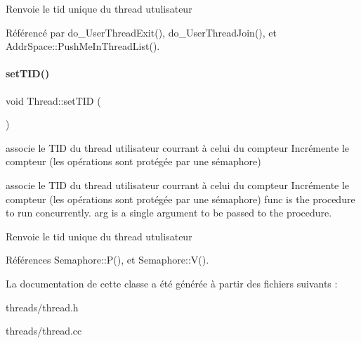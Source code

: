 \begin{DoxyReturn}{Renvoie}
le tid unique du thread utulisateur 
\end{DoxyReturn}


Référencé par do\+\_\+\+User\+Thread\+Exit(), do\+\_\+\+User\+Thread\+Join(), et Addr\+Space\+::\+Push\+Me\+In\+Thread\+List().

\hypertarget{class_thread_a6208073ef0f52efa40eb5e813a191954}{}\label{class_thread_a6208073ef0f52efa40eb5e813a191954} 
\paragraph{\texorpdfstring{set\+T\+I\+D()}{setTID()}}
{\footnotesize\ttfamily void Thread\+::set\+T\+ID (\begin{DoxyParamCaption}{ }\end{DoxyParamCaption})}



associe le T\+ID du thread utilisateur courrant à celui du compteur Incrémente le compteur (les opérations sont protégée par une sémaphore) 

associe le T\+ID du thread utilisateur courrant à celui du compteur Incrémente le compteur (les opérations sont protégée par une sémaphore)  func is the procedure to run concurrently.  arg is a single argument to be passed to the procedure.

\begin{DoxyReturn}{Renvoie}
le tid unique du thread utulisateur 
\end{DoxyReturn}


Références Semaphore\+::\+P(), et Semaphore\+::\+V().



La documentation de cette classe a été générée à partir des fichiers suivants \+:\begin{DoxyCompactItemize}
\item 
threads/thread.\+h\item 
threads/thread.\+cc\end{DoxyCompactItemize}
